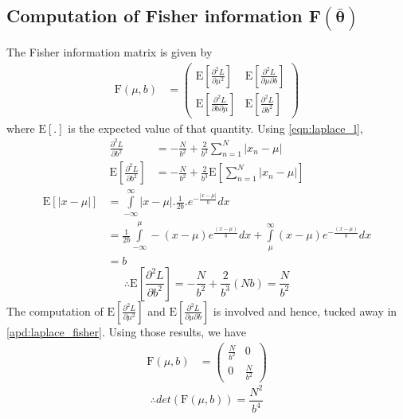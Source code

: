 \documentclass[wcp]{jmlr}
\begin{document}
\subsection*{Computation of Fisher information $\mathbf{F(\bar{\boldsymbol{\theta}})}$}
The Fisher information matrix is given by
\begin{align*}
  \mathrm{F}(\mu,b) &= \left( \begin{array}{cc}
  \mathrm{E} \left[\frac{\partial^2 L}{\partial \mu^2}\right] & \mathrm{E} \left[\frac{\partial^2 L}{\partial\mu \partial b}\right] \\
  \mathrm{E} \left[\frac{\partial^2 L}{\partial b \partial\mu}\right] & \mathrm{E} \left[\frac{\partial^2 L}{\partial b^2}\right] 
  \end{array} \right) 
\end{align*}
where $\mathrm{E}[.]$ is the expected value of that quantity. Using \eqref{eqn:laplace_l},
\begin{align*}
 \frac{\partial^2 L}{\partial b^2} &= -\frac{N}{b^2} + \frac{2}{b^3} \sum_{n=1}^N |x_n-\mu| \\
 \mathrm{E} \left[\frac{\partial^2 L}{\partial b^2}\right] &= -\frac{N}{b^2} + \frac{2}{b^3} \mathrm{E}\left[\sum_{n=1}^N |x_n-\mu|\right]
\end{align*}
\begin{align*}
 \mathrm{E}\left[|x-\mu|\right] &= \int\limits_{-\infty}^{\infty} |x-\mu| . \frac{1}{2b} . e^{-\frac{|x-\mu|}{b}} dx \\
 &= \frac{1}{2b} \int\limits_{-\infty}^{\mu} -(x-\mu) e^{\frac{(x-\mu)}{b}} dx + \int\limits_{\mu}^{\infty} (x-\mu)e^{-\frac{(x-\mu)}{b}} dx \\
 &= b
\end{align*}
\begin{equation*}
 \therefore \mathrm{E} \left[\frac{\partial^2 L}{\partial b^2}\right] = -\frac{N}{b^2} + \frac{2}{b^3} (Nb) = \frac{N}{b^2} 
\end{equation*}
The computation of $\mathrm{E}\left[\frac{\partial^2 L}{\partial \mu^2}\right]$ and 
$\mathrm{E}\left[\frac{\partial^2 L}{\partial \mu \partial b}\right]$ is involved and hence,
tucked away in \autoref{apd:laplace_fisher}. Using those results, we have
\begin{align*}
  \mathrm{F}(\mu,b) &= \left( \begin{array}{cc}
        \frac{N}{b^2} & 0 \\
        0 & \frac{N}{b^2}
            \end{array} \right) 
\end{align*}
\begin{equation} \therefore det(\mathrm{F}(\mu,b)) = \frac{N^2}{b^4} \label{eqn:laplace_fisher} \end{equation}
\end{document}

